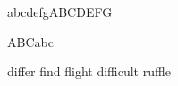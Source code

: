 \documentclass{article}
\begin{document}
\textgreek{abcdefgABCDEFG}

{\selectfont ABCabc}

differ find flight difficult ruffle
\end{document}

